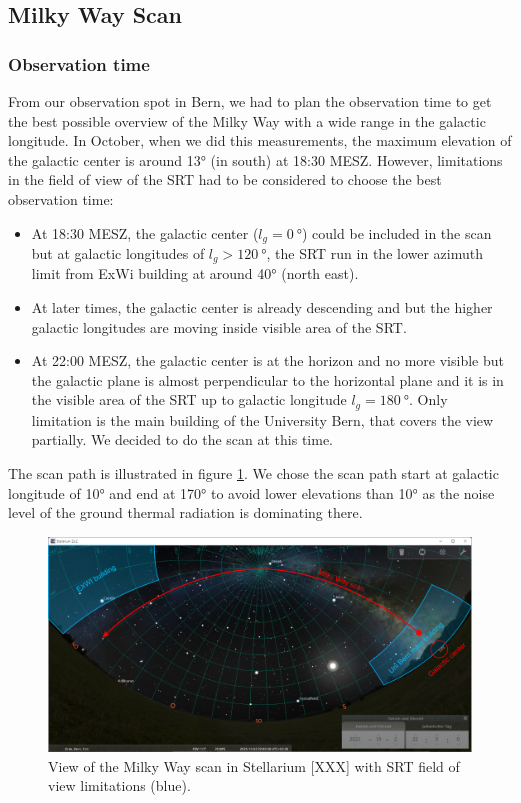 \subsection{Milky Way Scan}

\subsubsection{Observation time}
From our observation spot in Bern, we had to plan the observation time to get the best possible overview of the Milky Way with a wide range in the galactic longitude. In October, when we did this measurements, the maximum elevation of the galactic center is around 13° (in south) at 18:30 MESZ. However, limitations in the field of view of the SRT had to be considered to choose the best observation time:

\begin{itemize}
    \item At 18:30 MESZ, the galactic center ($l_g=\SI{0}{\degree}$) could be included in the scan but at galactic longitudes of $l_g>\SI{120}{\degree}$, the SRT run in the lower azimuth limit from ExWi building at around 40° (north east).
    \item At later times, the galactic center is already descending and but the higher galactic longitudes are moving inside visible area of the SRT.
    \item At 22:00 MESZ, the galactic center is at the horizon and no more visible but the galactic plane is almost perpendicular to the horizontal plane and it is in the visible area of the SRT up to galactic longitude $l_g=\SI{180}{\degree}$. Only limitation is the main building of the University Bern, that covers the view partially. We decided to do the scan at this time. 
\end{itemize}

The scan path is illustrated in figure \ref{fig:mw_scan_stellarium}. We chose the scan path start at galactic longitude of 10° and end at 170° to avoid lower elevations than 10° as the noise level of the ground thermal radiation is dominating there.


\begin{figure}[H]
    \centering
    \includegraphics[width=12cm]{assets/stellariumView_edit.png}
    \caption{View of the Milky Way scan in Stellarium [XXX] with SRT field of view limitations (blue).}
    \label{fig:mw_scan_stellarium}
\end{figure}

